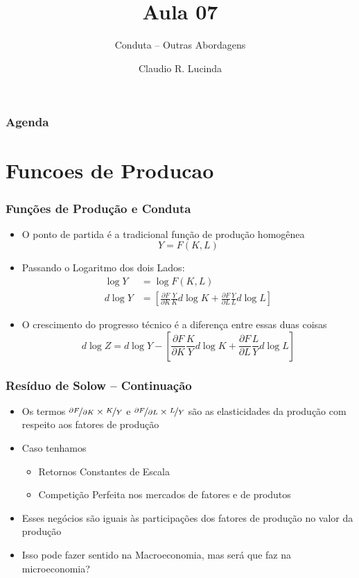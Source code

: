 \documentclass{beamer}
\title{Aula 07}
\subtitle{Conduta -- Outras Abordagens}
\author{Claudio R. Lucinda}
\institute{FEA-RP/USP}
\date{}
\begin{document}
\frame{\titlepage}
\begin{frame}\frametitle{Agenda}
  \tableofcontents[pausesections]
\end{frame}

\section{Funcoes de Producao}
\begin{frame}[fragile]\frametitle{Funções de Produção e Conduta}
    \begin{itemize}
        \item O ponto de partida é a tradicional função de produção homogênea
        \begin{equation*}
            Y=F(K,L)
        \end{equation*}
        \item Passando o Logaritmo dos dois Lados:
        \begin{align*}
            \log{Y}&=\log{F(K,L)}  \\
            d\log{Y}&=\left [\frac{\partial F}{\partial K}\frac{Y}{K}d\log{K} + \frac{\partial F}{\partial L}\frac{Y}{L} d\log{L} \right]
        \end{align*}
        \item O crescimento do progresso técnico é a diferença entre essas duas coisas
        \begin{equation}
            d\log{Z}=d\log{Y}-\left [\frac{\partial F}{\partial K}\frac{K}{Y}d\log{K} + \frac{\partial F}{\partial L}\frac{L}{Y} d\log{L} \right]
        \end{equation}
    \end{itemize}
    

\end{frame}
\begin{frame}[fragile]\frametitle{Resíduo de Solow -- Continuação}
    \begin{itemize}
        \item Os termos $\nicefrac{\partial F}{\partial K} \times \nicefrac{K}{Y}$ e $\nicefrac{\partial F}{\partial L} \times \nicefrac{L}{Y}$ são as elasticidades da produção com respeito aos fatores de produção
        \item Caso tenhamos
        \begin{itemize}
            \item Retornos Constantes de Escala
            \item Competição Perfeita nos mercados de fatores e de produtos
        \end{itemize}
        \item Esses negócios são iguais às participações dos fatores de produção no valor da produção
        \item Isso pode fazer sentido na Macroeconomia, mas será que faz na microeconomia?
    \end{itemize}


\end{frame}
\end{document}
